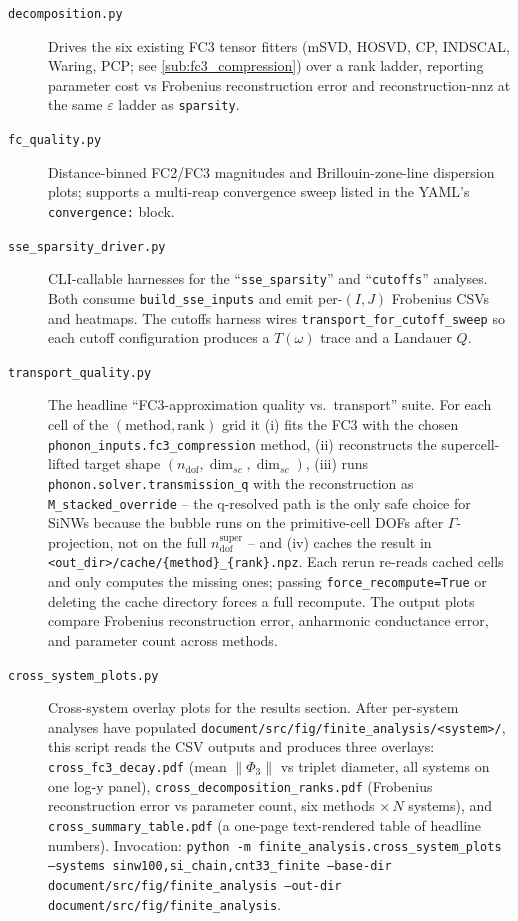 \begin{description}
\item[\texttt{decomposition.py}] Drives the six existing FC3 tensor
  fitters (mSVD, HOSVD, CP, INDSCAL, Waring, PCP; see
  \cref{sub:fc3_compression}) over a rank ladder, reporting parameter
  cost vs Frobenius reconstruction error and reconstruction-nnz at the
  same $\varepsilon$ ladder as \texttt{sparsity}.

\item[\texttt{fc\_quality.py}] Distance-binned FC2/FC3 magnitudes and
  Brillouin-zone-line dispersion plots; supports a multi-reap
  convergence sweep listed in the YAML's \texttt{convergence:} block.

\item[\texttt{sse\_sparsity\_driver.py}] CLI-callable harnesses for the
  ``\texttt{sse\_sparsity}'' and ``\texttt{cutoffs}'' analyses.  Both
  consume \texttt{build\_sse\_inputs} and emit per-$(I, J)$ Frobenius
  CSVs and heatmaps.  The cutoffs harness wires
  \texttt{transport\_for\_cutoff\_sweep} so each cutoff configuration
  produces a $T(\omega)$ trace and a Landauer $Q$.

\item[\texttt{transport\_quality.py}] The headline ``FC3-approximation
  quality vs.\ transport'' suite.  For each cell of the
  $(\text{method}, \text{rank})$ grid it (i) fits the FC3 with the
  chosen \texttt{phonon\_inputs.fc3\_compression} method, (ii)
  reconstructs the supercell-lifted target shape
  $(n_\mathrm{dof}, \dim_{sc}, \dim_{sc})$, (iii) runs
  \texttt{phonon.solver.transmission\_q} with the reconstruction as
  \texttt{M\_stacked\_override} -- the q-resolved path is the only
  safe choice for SiNWs because the bubble runs on the primitive-cell
  DOFs after $\Gamma$-projection, not on the full $n_\mathrm{dof}^\mathrm{super}$ --
  and (iv) caches the result in
  \texttt{<out\_dir>/cache/\{method\}\_\{rank\}.npz}.  Each rerun
  re-reads cached cells and only computes the missing ones; passing
  \texttt{force\_recompute=True} or deleting the cache directory
  forces a full recompute.  The output plots compare Frobenius
  reconstruction error, anharmonic conductance error, and parameter
  count across methods.

\item[\texttt{cross\_system\_plots.py}] Cross-system overlay plots
  for the results section.  After per-system analyses have populated
  \texttt{document/src/fig/finite\_analysis/<system>/}, this script
  reads the CSV outputs and produces three overlays:
  \texttt{cross\_fc3\_decay.pdf} (mean $\|\Phi_3\|$ vs triplet
  diameter, all systems on one log-y panel),
  \texttt{cross\_decomposition\_ranks.pdf} (Frobenius reconstruction
  error vs parameter count, six methods $\times\,N$ systems), and
  \texttt{cross\_summary\_table.pdf} (a one-page text-rendered table
  of headline numbers).  Invocation:
  \texttt{python -m finite\_analysis.cross\_system\_plots --systems
  sinw100,si\_chain,cnt33\_finite --base-dir
  document/src/fig/finite\_analysis --out-dir
  document/src/fig/finite\_analysis}.


\end{description}
